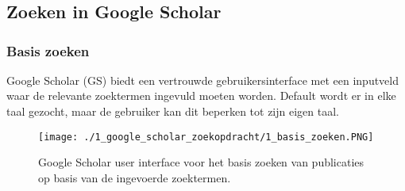 \chapter{}%
\label{ch:googlescholarzoekopdracht}


\section{Zoeken in Google Scholar \autocite{JohnSBailey2025}}
\subsection{Basis zoeken}
Google Scholar (GS) biedt een vertrouwde gebruikersinterface met een inputveld waar de relevante zoektermen ingevuld moeten worden. Default wordt er in elke taal gezocht, maar de gebruiker kan dit beperken tot zijn eigen taal.

\begin{figure}
    \centering
    \texttt{[image: ./1\_google\_scholar\_zoekopdracht/1\_basis\_zoeken.PNG]}
    \caption[Google Scholar basis zoeken.]{\label{fig:Google Scholar basis zoeken}Google Scholar user interface voor het basis zoeken van publicaties op basis van de ingevoerde zoektermen.}
\end{figure}

